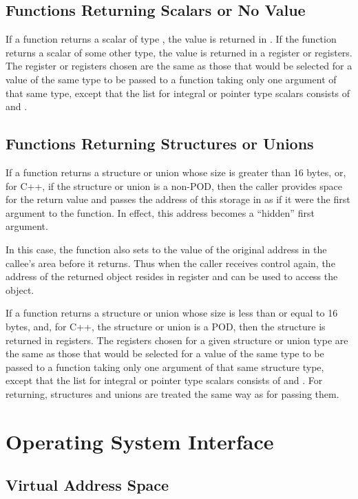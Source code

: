 \subsection{Functions Returning Scalars or No Value}

If a function returns a scalar of type , the value is
returned in .  If the function returns a scalar of some other
type, the value is returned in a register or registers.  The register
or registers chosen are the same as those that would be selected for a
value of the same type to be passed to a function taking only one
argument of that same type, except that the list for integral or
pointer type scalars consists of \RAX and \RDX.

\subsection{Functions Returning Structures or Unions}

If a function returns a structure or union whose size is greater than
16 bytes, or, for C++, if the structure or union is a non-POD, then
the caller provides space for the return value and passes the address
of this storage in \RDI as if it were the first argument to the
function.  In effect, this address becomes a ``hidden'' first
argument.

In this case, the function also sets \RDI to the value of the original
address in the callee's area before it returns.  Thus when the caller
receives control again, the address of the returned object resides in
register \RDI and can be used to access the object.
  
If a function returns a structure or union whose size is less than or
equal to 16 bytes, and, for C++, the structure or union is a POD, then
the structure is returned in registers.  The registers chosen for a
given structure or union type are the same as those that would be
selected for a value of the same type to be passed to a function
taking only one argument of that same structure type, except that the
list for integral or pointer type scalars consists of \RAX and \RDX.
For returning, structures and unions are treated the same way as for
passing them.

\section{Operating System Interface}

\subsection{Virtual Address Space}

